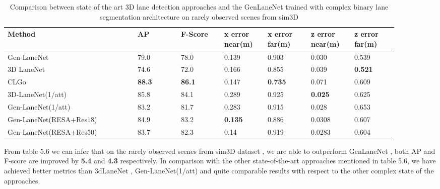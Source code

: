         \begin{table}[htbp]
    \centering
    \caption{Comparison between state of the art 3D lane detection approaches and the GenLaneNet \cite{Guo_2018_ECCV} trained with complex binary lane segmentation architecture on rarely observed scenes from sim3D \cite{guo2020gen}}
    \begin{tabular}{|p{0.3\linewidth}|p{0.1\linewidth}|p{0.1\linewidth}|p{0.1\linewidth}|p{0.1\linewidth}|p{0.1\linewidth}|p{0.1\linewidth}|}
    \hline
        \textbf{Method} & \textbf{AP} & \textbf{F-Score} & \textbf{x error near(m)} & \textbf{x error far(m)} & \textbf{z error near(m)} & \textbf{z error far(m)} \\ \hline
        Gen-LaneNet\cite{guo2020gen} & 79.0 & 78.0 & 0.139 & 0.903 & 0.030 & 0.539 \\ \hline
        3D LaneNet\cite{DBLP:journals/corr/abs-1811-10203} & 74.6 & 72.0 & 0.166 & 0.855 & 0.039 &\textbf{ 0.521} \\ \hline
        CLGo\cite{DBLP:journals/corr/abs-2112-15351} &\textbf{ 88.3} &\textbf{ 86.1} & 0.147 & \textbf{0.735} & 0.071 & 0.609 \\ \hline
        3D-LaneNet(1/att)\cite{9506296} & 85.8 & 84.1 & 0.289 & 0.925 &\textbf{ 0.025} & 0.625 \\ \hline
        Gen-LaneNet(1/att)\cite{9506296} & 83.2 & 81.7 & 0.283 & 0.915 & 0.028 & 0.653 \\ \hline
        Gen-LaneNet(RESA+Res18) &  84.9 & 83.2 &\textbf{ 0.135} & 0.886 & 0.0308 & 0.607 \\ \hline
        Gen-LaneNet(RESA+Res50) & 83.7 & 82.3 & 0.14 & 0.919 & 0.0283 & 0.604 \\ \hline
    \end{tabular}
\end{table}
    
     From table 5.6 we can infer that on the rarely observed scenes from sim3D dataset \cite{guo2020gen}, we are able to outperform GenLaneNet \cite{guo2020gen}, both AP and F-score are improved by \textbf{5.4} and \textbf{4.3} respectively. In comparison with the other state-of-the-art approaches mentioned in table 5.6, we have achieved better metrics than 3dLaneNet \cite{DBLP:journals/corr/abs-1811-10203}, Gen-LaneNet(1/att) \cite{9506296} and quite comparable results with respect to the other complex state of the approaches. 
    
